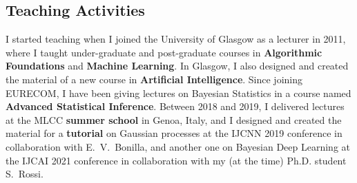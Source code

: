 \documentclass[oneside, a4paper, onecolumn, 10pt]{article}
\begin{document}



\subsection*{Teaching Activities}

I started teaching when I joined the University of Glasgow as a lecturer in 2011, where I taught under-graduate and post-graduate courses in {\bf Algorithmic Foundations} and {\bf Machine Learning}.
In Glasgow, I also designed and created the material of a new course in {\bf Artificial Intelligence}. 
Since joining EURECOM, I have been giving lectures on Bayesian Statistics in a course named {\bf Advanced Statistical Inference}.
Between 2018 and 2019, I delivered lectures at the MLCC {\bf summer school} in Genoa, Italy, and I designed and created the material for a {\bf tutorial} on Gaussian processes at the IJCNN 2019 conference in collaboration with E.~V.~Bonilla, and another one on Bayesian Deep Learning at the IJCAI 2021 conference in collaboration with my (at the time) Ph.D. student S.~Rossi. 

\end{document}
